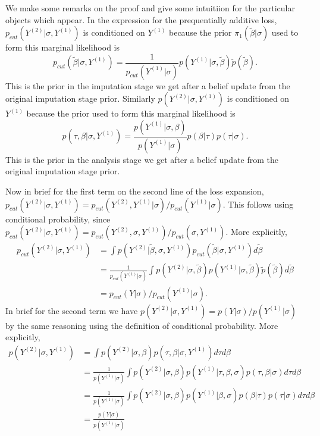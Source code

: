 We make some remarks on the proof and give some intuitiion for the particular objects which appear. In the expression for the prequentially additive loss, $p_{cut}(Y^{(2)}|\sigma,Y^{(1)})$ is conditioned on $Y^{(1)}$ because the prior $\pi_1(\tilde\beta|\sigma)$ used to form this marginal likelihood is
\[
  p_{cut}(\tilde\beta|\sigma,Y^{(1)})= \frac{1}{p_{cut}(Y^{(1)}|\sigma)}p(Y^{(1)}|\sigma,\tilde \beta)\tilde p(\tilde\beta).
\]
This is the prior in the imputation stage we get after a belief update from the original imputation stage prior. Similarly $p(Y^{(2)}|\sigma,Y^{(1)})$ is conditioned on $Y^{(1)}$ because the prior used to form this marginal likelihood is
\[
  p(\tau,\beta|\sigma,Y^{(1)})= \frac{p(Y^{(1)}|\sigma,\beta)}{p(Y^{(1)}|\sigma)}p(\beta|\tau)p(\tau|\sigma).
\]
This is the prior in the analysis stage we get after a belief update from the original imputation stage prior.

Now in brief for the first term on the second line of the loss expansion, $p_{cut}(Y^{(2)}|\sigma,Y^{(1)})=p_{cut}(Y^{(2)},Y^{(1)}|\sigma)/p_{cut}(Y^{(1)}|\sigma)$. This follows using conditional probability, since $p_{cut}(Y^{(2)}|\sigma,Y^{(1)})=p_{cut}(Y^{(2)},\sigma,Y^{(1)})/p_{cut}(\sigma,Y^{(1)})$.
More explicitly,
\begin{align*}
  p_{cut}(Y^{(2)}|\sigma,Y^{(1)})
   & =\int p(Y^{(2)}|\tilde\beta,\sigma,Y^{(1)}) p_{cut}(\tilde\beta|\sigma,Y^{(1)}) d\tilde\beta                                           \\
   & = \frac{1}{p_{cut}(Y^{(1)}|\sigma)}\int p(Y^{(2)}|\sigma,\tilde\beta) p(Y^{(1)}|\sigma,\tilde \beta)\tilde p(\tilde\beta) d\tilde\beta \\
   & =p_{cut}(Y|\sigma)/p_{cut}(Y^{(1)}|\sigma).
\end{align*}
In brief for the second term we have $p(Y^{(2)}|\sigma,Y^{(1)})=p(Y|\sigma)/p(Y^{(1)}|\sigma)$ by the same reasoning using the definition of conditional probability. More explicitly,
\begin{align*}
  p(Y^{(2)}|\sigma,Y^{(1)}) & =\int p(Y^{(2)}|\sigma,\beta)p(\tau,\beta|\sigma,Y^{(1)}) d\tau d\beta                                                 \\
                            & =\frac{1}{p(Y^{(1)}|\sigma)}\int p(Y^{(2)}|\sigma,\beta)p(Y^{(1)}|\tau,\beta,\sigma)p(\tau,\beta|\sigma) d\tau d\beta  \\
                            & =\frac{1}{p(Y^{(1)}|\sigma)}\int p(Y^{(2)}|\sigma,\beta)p(Y^{(1)}|\beta,\sigma)p(\beta|\tau)p(\tau|\sigma)d\tau d\beta \\
                            & =\frac{p(Y|\sigma)}{p(Y^{(1)}|\sigma)}
\end{align*}


